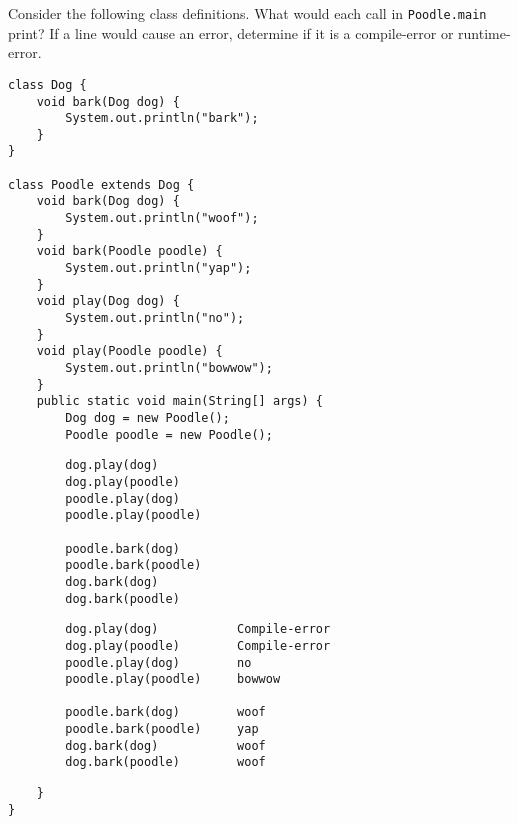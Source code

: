 \begin{blocksection}
\question Consider the following class definitions. What would each call in \lstinline$Poodle.main$ print? If a line would cause an error, determine if it is a compile-error or runtime-error.

\begin{lstlisting}
class Dog {
    void bark(Dog dog) {
        System.out.println("bark");
    }
}

class Poodle extends Dog {
    void bark(Dog dog) {
        System.out.println("woof");
    }
    void bark(Poodle poodle) {
        System.out.println("yap");
    }
    void play(Dog dog) {
        System.out.println("no");
    }
    void play(Poodle poodle) {
        System.out.println("bowwow");
    }
    public static void main(String[] args) {
        Dog dog = new Poodle();
        Poodle poodle = new Poodle();
\end{lstlisting}

\ifprintanswers\else
\begin{lstlisting}
        dog.play(dog)
        dog.play(poodle)
        poodle.play(dog)
        poodle.play(poodle)

        poodle.bark(dog)
        poodle.bark(poodle)
        dog.bark(dog)
        dog.bark(poodle)
\end{lstlisting}
\fi

\begin{solution}
\begin{lstlisting}
        dog.play(dog)           Compile-error
        dog.play(poodle)        Compile-error
        poodle.play(dog)        no
        poodle.play(poodle)     bowwow

        poodle.bark(dog)        woof
        poodle.bark(poodle)     yap
        dog.bark(dog)           woof
        dog.bark(poodle)        woof
\end{lstlisting}
\end{solution}

\begin{lstlisting}
    }
}
\end{lstlisting}
\end{blocksection}
